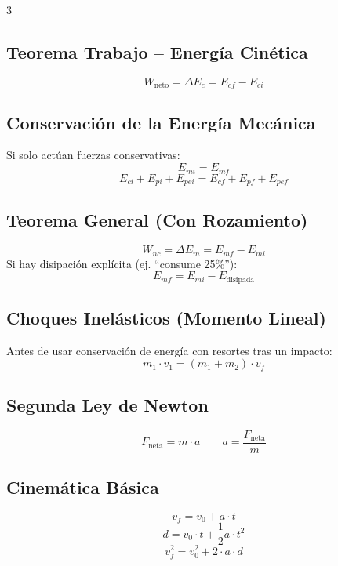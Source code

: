 \documentclass[10pt,landscape]{article}
\begin{document}
\begin{multicols}{3}

\subsection*{Teorema Trabajo -- Energ\'{i}a Cin\'{e}tica}
\[
\boxed{W_{\text{neto}} = \Delta E_c = E_{cf} - E_{ci}}
\]

\subsection*{Conservaci\'{o}n de la Energ\'{i}a Mec\'{a}nica}
Si solo act\'{u}an fuerzas conservativas:
\[
\boxed{E_{mi} = E_{mf}}
\]
\[
E_{ci} + E_{pi} + E_{pei} = E_{cf} + E_{pf} + E_{pef}
\]

\subsection*{Teorema General (Con Rozamiento)}
\[
\boxed{W_{nc} = \Delta E_m = E_{mf} - E_{mi}}
\]
Si hay disipaci\'{o}n expl\'{i}cita (ej. ``consume 25\%''):
\[
E_{mf} = E_{mi} - E_{\text{disipada}}
\]

\subsection*{Choques Inel\'{a}sticos (Momento Lineal)}
Antes de usar conservaci\'{o}n de energ\'{i}a con resortes tras un impacto:
\[
\boxed{m_1 \cdot v_1 = (m_1 + m_2) \cdot v_f}
\]

\vspace{4pt}

\subsection*{Segunda Ley de Newton}
\[
\boxed{F_{\text{neta}} = m \cdot a} \qquad \boxed{a = \frac{F_{\text{neta}}}{m}}
\]

\subsection*{Cinem\'{a}tica B\'{a}sica}
\[
v_f = v_0 + a \cdot t
\]
\[
d = v_0 \cdot t + \frac{1}{2} a \cdot t^2
\]
\[
\boxed{v_f^2 = v_0^2 + 2 \cdot a \cdot d}
\]


\end{multicols}
\end{document}
